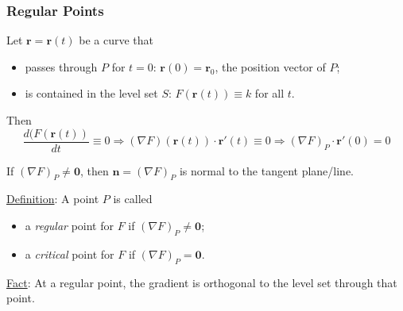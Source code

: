 \begin{frame}
  \frametitle{Regular Points}

 Let $\textbf{r}=\textbf{r}(t)$ be a curve that
%
\begin{itemize}
  \item passes through $P$ for $t=0$: $\textbf{r}(0) = \textbf{r}_0$, the position vector of $P$;
  \item is contained in the level set $S$: $F(\textbf{r}(t)) \equiv k$ for all $t$.
\end{itemize}

Then
%
$$ \frac{d(F(\textbf{r}(t))}{dt} \equiv 0 \Longrightarrow (\nabla F)(\textbf{r}(t)) \cdot \textbf{r}'(t) \equiv 0 \Longrightarrow (\nabla F)_P \cdot \textbf{r}'(0) =0$$

\pause
If $(\nabla F)_P \neq \textbf{0}$, then $\textbf{n}= (\nabla F)_P$ is normal to the tangent plane/line.

\pause
\medskip
\underline{Definition}: A point $P$ is called
\begin{itemize}
  \item a \emph{regular} point for $F$ if $(\nabla F)_P \neq \textbf{0}$;
  \item a \emph{critical} point for $F$ if $(\nabla F)_P = \textbf{0}$.
\end{itemize}

\pause
\medskip
\underline{Fact}: At a regular point, the gradient is orthogonal to the level set through that point.
\end{frame}